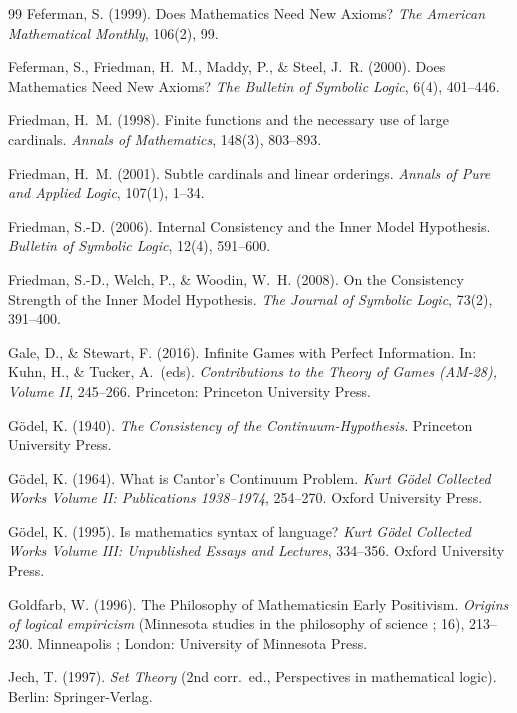 \documentclass[12pt]{article}
\theoremstyle{plain}
\theoremstyle{definition}
\begin{document}
\begin{thebibliography}{99}
	 Feferman, S. (1999). Does Mathematics Need New Axioms? \textit{The American Mathematical Monthly}, 106(2), 99.

	 Feferman, S., Friedman, H.\ M., Maddy, P., \& Steel, J.\ R. (2000). Does Mathematics Need New Axioms? \textit{The Bulletin of Symbolic Logic}, 6(4), 401--446.

	 Friedman, H.\ M. (1998). Finite functions and the necessary use of large cardinals. \textit{Annals of Mathematics}, 148(3), 803--893.

	 Friedman, H.\ M. (2001). Subtle cardinals and linear orderings. \textit{Annals of Pure and Applied Logic}, 107(1), 1--34.

	 Friedman, S.-D. (2006). Internal Consistency and the Inner Model Hypothesis. \textit{Bulletin of Symbolic Logic}, 12(4), 591--600.

	 Friedman, S.-D., Welch, P., \& Woodin, W.\ H. (2008). On the Consistency Strength of the Inner Model Hypothesis. \textit{The Journal of Symbolic Logic}, 73(2), 391--400.

	 Gale, D., \& Stewart, F. (2016). Infinite Games with Perfect Information. In: Kuhn, H., \& Tucker, A.\ (eds). \textit{Contributions to the Theory of Games (AM-28), Volume II}, 245--266. Princeton: Princeton University Press.

	 G\"odel, K. (1940). \textit{The Consistency of the Continuum-Hypothesis}. Princeton University Press.

	 G\"odel, K. (1964). What is Cantor's Continuum Problem. \textit{Kurt G\"odel Collected Works Volume II: Publications 1938--1974}, 254--270. Oxford University Press.

	 G\"odel, K. (1995). Is mathematics syntax of language? \textit{Kurt G\"odel Collected Works Volume III: Unpublished Essays and Lectures}, 334--356. Oxford University Press.

	 Goldfarb, W. (1996). The Philosophy of Mathematicsin Early Positivism. \textit{Origins of logical empiricism} (Minnesota studies in the philosophy of science ; 16), 213--230. Minneapolis ; London: University of Minnesota Press.

	 Jech, T. (1997). \textit{Set Theory} (2nd corr.\ ed., Perspectives in mathematical logic). Berlin: Springer-Verlag.


\end{thebibliography}
\end{document}
